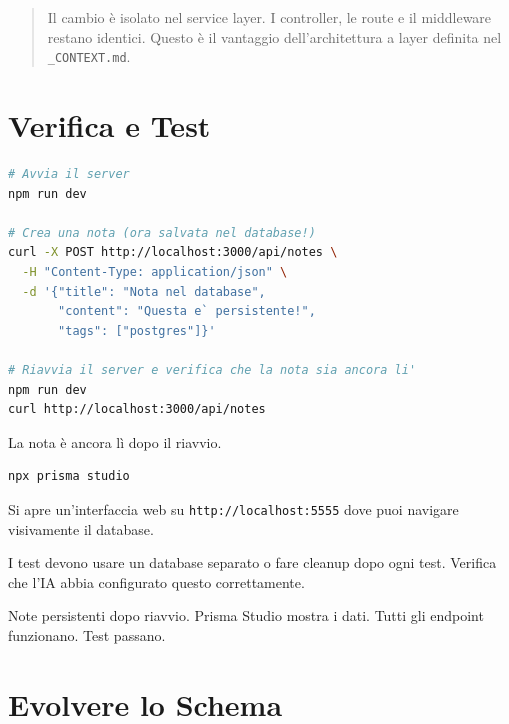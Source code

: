 \begin{quote}
Il cambio è isolato nel service layer. I controller, le route e il middleware restano identici. Questo è il vantaggio dell'architettura a layer definita nel \texttt{\_CONTEXT.md}.
\end{quote}

\section{Verifica e Test}

\begin{praticabox}[title={Pratica --- Test del database}]
\begin{lstlisting}[language=bash]
# Avvia il server
npm run dev

# Crea una nota (ora salvata nel database!)
curl -X POST http://localhost:3000/api/notes \
  -H "Content-Type: application/json" \
  -d '{"title": "Nota nel database",
       "content": "Questa e` persistente!",
       "tags": ["postgres"]}'

# Riavvia il server e verifica che la nota sia ancora li'
npm run dev
curl http://localhost:3000/api/notes
\end{lstlisting}
La nota è ancora lì dopo il riavvio.
\end{praticabox}

\begin{praticabox}[title={Pratica --- Prisma Studio}]
\begin{lstlisting}[language=bash]
npx prisma studio
\end{lstlisting}
Si apre un'interfaccia web su \texttt{http://localhost:5555} dove puoi navigare visivamente il database.
\end{praticabox}

\begin{warnbox}
I test devono usare un database separato o fare cleanup dopo ogni test. Verifica che l'IA abbia configurato questo correttamente.
\end{warnbox}

\begin{checkpointbox}
Note persistenti dopo riavvio. Prisma Studio mostra i dati. Tutti gli endpoint funzionano. Test passano.
\end{checkpointbox}

\section{Evolvere lo Schema}


